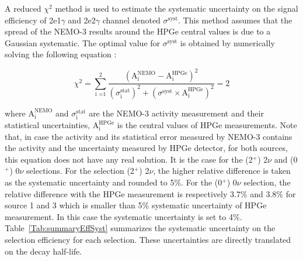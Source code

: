 \documentclass[main.tex]{subfiles}
\begin{document}
\FloatBarrier




\bigskip



\NI A reduced $\chi^{\text{2}}$ method is used to estimate the systematic uncertainty on the signal efficiency of 2e1$\gamma$ and 2e2$\gamma$ channel denoted $\sigma^{\text{syst}}$. This method assumes that the spread of the NEMO-3 results around the HPGe central values is due to a Gaussian systematic. The optimal value for $\sigma^{\text{syst}}$ is obtained by numerically solving the following equation : 
 

\begin{equation}
\chi^2 = \sum_{\text{i =1}}^{\text{2}} \frac{(\text{A}_\text{i}^{\text{NEMO}} - \text{A}_\text{i}^{\text{HPGe}})^\text{2}} {(\sigma_\text{i}^{\text{stat}})^\text{2} + (\sigma^{\text{syst}} \times \text{A}_\text{i}^{\text{HPGe}})^\text{2}} = \text{2}
\end{equation}


\NI where $\text{A}_\text{i}^{\text{NEMO}}$ and $\sigma_\text{i}^{\text{stat}}$ are the NEMO-3 activity measurement and their statistical uncertainties, $\text{A}_\text{i}^{\text{HPGe}}$ is the central values of HPGe measurements. Note that, in case the activity and its statistical error measured by NEMO-3 contains the activity and the uncertainty measured by HPGe detector, for both sources, this equation does not have any real solution. It is the case for the (2$^+$) 2$\nu$ and (0$^+$) 0$\nu$ selections. For the selection (2$^+$) 2$\nu$, the higher relative difference is taken as the systematic uncertainty and rounded to 5\%. For the (0$^+$) 0$\nu$ selection, the relative difference with the HPGe measurement is respectively 3.7\% and 3.8\% for source 1 and 3 which is smaller than 5\% systematic uncertainty of HPGe measurement. In this case the systematic uncertainty is set to 4\%. Table~\ref{Tab:summaryEffSyst} summarizes the systematic uncertainty on the selection efficiency for each selection. These uncertainties are directly translated on the decay half-life.
\end{document}

